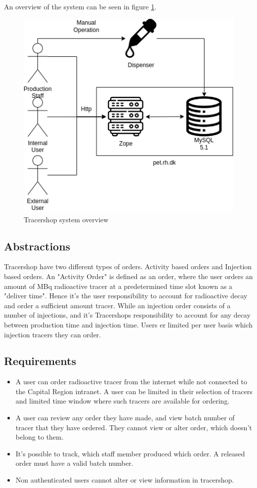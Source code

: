 \documentclass{article}
\begin{document}
An overview of the system can be seen in figure \ref{fig:oldsys}.
\begin{figure}[ht]
  \begin{center}
    \includegraphics[width=0.6\linewidth]{OldSetup.png}
    \caption{Tracershop system overview}
    \label{fig:oldsys}
  \end{center}
\end{figure}

\subsection*{Abstractions}
Tracershop have two different types of orders. Activity based orders and Injection based orders.
An "Activity Order" is defined as an order, where the user orders an amount of MBq radioactive tracer at a predetermined time slot known as a "deliver time".
Hence it's the user responsibility to account for radioactive decay and order a sufficient amount tracer.
While an injection order consists of a number of injections, and it's Tracershops responsibility to account for any decay between production time and injection time.
Users er limited per user basis which injection tracers they can order.

\subsection*{Requirements}

\begin{itemize}
  \item A user can order radioactive tracer from the internet while not connected to the Capital Region intranet.
  A user can be limited in their selection of tracers and limited time window where such tracers are available for ordering.
  \item A user can review any order they have made, and view batch number of tracer that they have ordered. They cannot view or alter order, which doesn't belong to them.
  \item It's possible to track, which staff member produced which order. A released order must have a valid batch number.
  \item Non authenticated users cannot alter or view information in tracershop.
\end{itemize}
\end{document}
